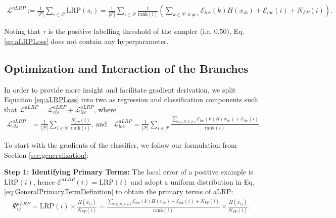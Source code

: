 \documentclass{article}
\begin{document}
{\begin{align}
\label{eq:aLRPLoss}
    \mathcal{L}^{aLRP}:=\frac{1}{|\mathcal{P}|}\sum \limits_{i \in \mathcal{P}} \mathrm{LRP}(s_i) 
    = \frac{1}{|\mathcal{P}|}\sum \limits_{i \in \mathcal{P}} \frac{1}{\mathrm{rank(i)}}
    \left( \sum \limits_{k \in \mathcal{P}, k \neq i}  \mathcal{E}_{loc}(k) H(x_{ik})+ \mathcal{E}_{loc}(i) + N_{FP}(i) \right).
\end{align}

Noting that $\tau$ is the positive labelling threshold of the sampler (i.e. $0.50$), Eq. \ref{eq:aLRPLoss} does not contain any hyperparameter.

\subsection{Optimization and Interaction of the Branches}
In order to provide more insight and facilitate gradient derivation, we split Equation \ref{eq:aLRPLoss} into two as regression and classification components such that $\mathcal{L}^{aLRP}=\mathcal{L}^{aLRP}_{cls}+\mathcal{L}^{aLRP}_{loc}$, where
\begin{align}
    \label{eq:aLRPComponents}
    \mathcal{L}^{aLRP}_{cls} &= \frac{1}{|\mathcal{P}|}\sum \limits_{i \in \mathcal{P}} \frac{N_{FP}(i)}{\mathrm{rank}(i)} \text{, and }\;\; \mathcal{L}^{aLRP}_{loc} = \frac{1}{|\mathcal{P}|}\sum \limits_{i \in \mathcal{P}} \frac{\sum \limits_{k \in \mathcal{P}, k \neq i}  \mathcal{E}_{loc}(k) H(x_{ik})+ \mathcal{E}_{loc}(i) }{\mathrm{rank}(i)}.
\end{align}

To start with the gradients of the classifier, we follow our formulation from Section \ref{sec:generalization}:

\textbf{Step 1: Identifying Primary Terms:} The local error of a positive example is $\mathrm{LRP}(i)$, hence $\mathcal{E}^{aLRP}(i) = \mathrm{LRP}(i)$ and adopt a uniform distribution in Eq. \ref{eq:GeneralPrimaryTermDefinition} to obtain the primary terms of aLRP:
\begin{align}
    \label{eq:aLRPGeneralPrimaryTermDefinition}
    \Psi^{aLRP}_{ij} = \mathrm{LRP}(i)  \times \frac{H(x_{ij})}{N_{FP}(i)} = \frac{ \sum \limits_{k \in \mathcal{P}, k \neq i}  \mathcal{E}_{loc}(k) H(x_{ik})+ \mathcal{E}_{loc}(i) + N_{FP}(i) }{\mathrm{rank}(i)} \times \frac{H(x_{ij})}{N_{FP}(i)}.
\end{align}


}
\end{document}

